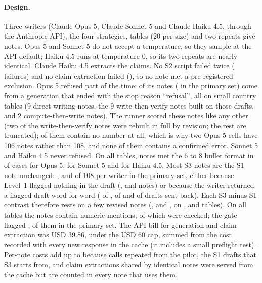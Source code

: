 \documentclass[11pt]{article}
\begin{document}
\paragraph{Design.} Three writers (Claude Opus 5, Claude Sonnet 5 and Claude Haiku 4.5, through the Anthropic API), the four strategies, \FullTables{} tables (20 per size) and two repeats give \FullNotes{} notes. Opus 5 and Sonnet 5 do not accept a temperature, so they sample at the API default; Haiku 4.5 runs at temperature 0, so its two repeats are nearly identical. Claude Haiku 4.5 extracts the claims. No S2 script failed twice (\FullFailed{} failures) and no claim extraction failed (\FullExtractFailed{}), so no note met a pre-registered exclusion. Opus 5 refused part of the time: \RefusedOpusAll{} of its notes (\RefusedOpusPrimary{} in the primary set) come from a generation that ended with the stop reason ``refusal'', all on \RefusalTables{} small country tables (9 direct-writing notes, the 9 write-then-verify notes built on those drafts, and 2 compute-then-write notes). The runner scored these notes like any other (two of the write-then-verify notes were rebuilt in full by revision; the rest are truncated); \NumberlessNotes{} of them contain no number at all, which is why two Opus 5 cells have 106 notes rather than 108, and none of them contains a confirmed error. Sonnet 5 and Haiku 4.5 never refused. On all \FullTables{} tables, notes met the 6 to 8 bullet format in \FormatOkOpus{} of cases for Opus 5, \FormatOkSonnet{} for Sonnet 5 and \FormatOkHaiku{} for Haiku 4.5. Most S3 notes are the S1 note unchanged: \SthreesameOpus{}, \SthreesameSonnet{} and \SthreesameHaiku{} of 108 per writer in the primary set, either because Level~1 flagged nothing in the draft (\SthreeNotSentOpus{}, \SthreeNotSentSonnet{} and \SthreeNotSentHaiku{} notes) or because the writer returned a flagged draft word for word (\SthreeVerbatimOpus{} of \SthreeSentOpus{}, \SthreeVerbatimSonnet{} of \SthreeSentSonnet{} and \SthreeVerbatimHaiku{} of \SthreeSentHaiku{} drafts sent back). Each S3 minus S1 contrast therefore rests on a few revised notes (\SthreechangedOpus{}, \SthreechangedSonnet{} and \SthreechangedHaiku{}, on \SthreeTablesOpus{}, \SthreeTablesSonnet{} and \SthreeTablesHaiku{} tables). On all \FullTables{} tables the notes contain \FullMentions{} numeric mentions, of which \FullChecked{} were checked; the gate flagged \FullFlags{}, \FlagsPrimary{} of them in the primary set. The API bill for generation and claim extraction was USD 39.86, under the USD 60 cap, summed from the cost recorded with every new response in the cache (it includes a small preflight test). Per-note costs add up to \FullCost{} because calls repeated from the pilot, the S1 drafts that S3 starts from, and claim extractions shared by identical notes were served from the cache but are counted in every note that uses them.
\end{document}

